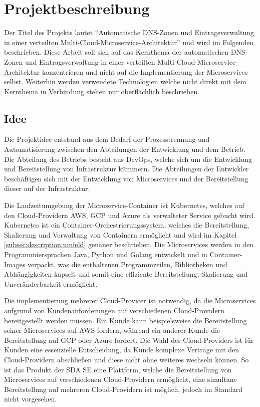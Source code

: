 \chapter{Projektbeschreibung}
\label{ch:description}
Der Titel des Projekts lautet \enquote{Automatische DNS-Zonen und Eintragsverwaltung in einer verteilten Multi-Cloud-Microservice-Architektur} und wird im Folgenden beschrieben.
Diese Arbeit soll sich auf das Kernthema der automatischen DNS-Zonen und Eintragsverwaltung in einer verteilten Multi-Cloud-Microservice-Architektur konzentrieren und nicht auf die Implementierung der Microservices selbst.
Weiterhin werden verwendete Technologien welche nicht direkt mit dem Kernthema in Verbindung stehen nur oberflächlich beschrieben.

\section{Idee}
\label{sec:description:projektidee}
Die Projektidee entstand aus dem Bedarf der Prozesstrennung und Automatisierung zwischen den Abteilungen der Entwicklung und dem Betrieb.
Die Abteilung des Betriebs besteht aus \ac{DevOps}, welche sich um die Entwicklung und Bereitstellung von Infrastruktur kümmern.
Die Abteilungen der Entwickler beschäftigen sich mit der Entwicklung von Microservices und der Bereitstellung dieser auf der Infrastruktur.

\medskip
\noindent

Die Laufzeitumgebung der Microservice-Container ist Kubernetes, welches auf den Cloud-Providern \ac{AWS}, \ac{GCP} und \ac{Azure} als verwalteter Service gebucht wird.
Kubernetes ist ein Container-Orchestrierungssystem, welches die Bereitstellung, Skalierung und Verwaltung von Containern ermöglicht und wird im Kapitel \ref{subsec:description:umfeld} genauer beschrieben.
Die Microservices werden in den Programmiersprachen Java, Python und Golang entwickelt und in Container-Images verpackt, was die enthaltenen Programmzeilen, Bibliotheken und Abhängigkeiten kapselt und somit eine effiziente Bereitstellung, Skalierung und Unveränderbarkeit ermöglicht.

\medskip
\noindent

Die implementierung mehrerer Cloud-Provicer ist notwendig, da die Microservices aufgrund von Kundenanforderungen auf verschiedenen Cloud-Providern bereitgestellt werden müssen.
Ein Kunde kann beispielsweise die Bereitstellung seiner Microservices auf \ac{AWS} fordern, während ein anderer Kunde die Bereitstellung auf \ac{GCP} oder \ac{Azure} fordert.
Die Wahl des Cloud-Providers ist für Kunden eine essenzielle Entscheidung, da Kunde komplexe Verträge mit den Cloud-Providern abschließen und diese nicht ohne weiteres wechseln können.
So ist das Produkt der SDA SE eine Plattform, welche die Bereitstellung von Microservices auf verschiedenen Cloud-Providern ermöglicht, eine simultane Bereitstellung auf mehreren Cloud-Providern ist möglich, jedoch im Standard nicht vorgesehen.


